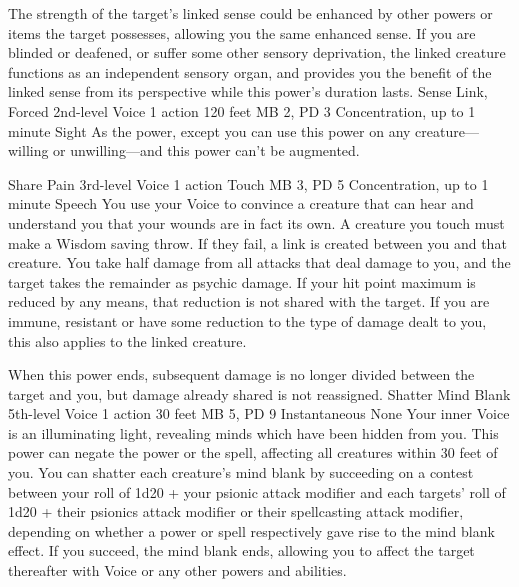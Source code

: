 The strength of the target's linked sense could be enhanced
by other powers or items the target possesses, allowing you
the same enhanced sense. If you are blinded or deafened, or
suffer some other sensory deprivation, the linked creature
functions as an independent sensory organ, and provides you
the benefit of the linked sense from its perspective while
this power's duration lasts.
\DndPowerHeader%
    {Sense Link, Forced\label{pwr:sense-link-forced}}
    {2nd-level Voice}
    {1 action}
    {120 feet}
    {MB 2, PD 3}
    {Concentration, up to 1 minute}
    {Sight}
As the  power, except you
can use this power on any creature---willing or unwilling---and
this power can't be augmented.

\DndPowerHeader%
    {Share Pain\label{pwr:share-pain}}
    {3rd-level Voice}
    {1 action}
    {Touch}
    {MB 3, PD 5}
    {Concentration, up to 1 minute}
    {Speech}
You use your Voice to convince a creature
that can hear and understand you
that your wounds are in fact its own. A creature you touch
must make a Wisdom saving throw. If they fail, a link is created
between you and that creature. You take half damage from all
attacks that deal damage to you, and the target takes the
remainder as psychic damage. If your hit point maximum is
reduced by any means, that reduction is not shared with the
target. If you are immune, resistant or have some reduction
to the type of damage dealt to you, this also applies to the
linked creature.

When this power ends, subsequent damage is no longer divided
between the target and you, but damage already shared is not
reassigned.
\DndPowerHeader%
    {Shatter Mind Blank\label{pwr:shatter-mind-blank}}
    {5th-level Voice}
    {1 action}
    {30 feet}
    {MB 5, PD 9}
    {Instantaneous}
    {None}
Your inner Voice is an illuminating light, revealing
minds which have been hidden from you. This power can negate
the  power or the 
spell, affecting all creatures within 30 feet of you. You
can shatter each creature's mind blank by succeeding on a
contest between your roll of 1d20 + your psionic attack modifier
and each targets' roll of 1d20 + their psionics attack modifier
or their spellcasting attack modifier, depending on whether
a power or spell respectively gave rise to the mind blank
effect. If you succeed, the mind blank ends, allowing
you to affect the target thereafter with Voice or any other
powers and abilities.

